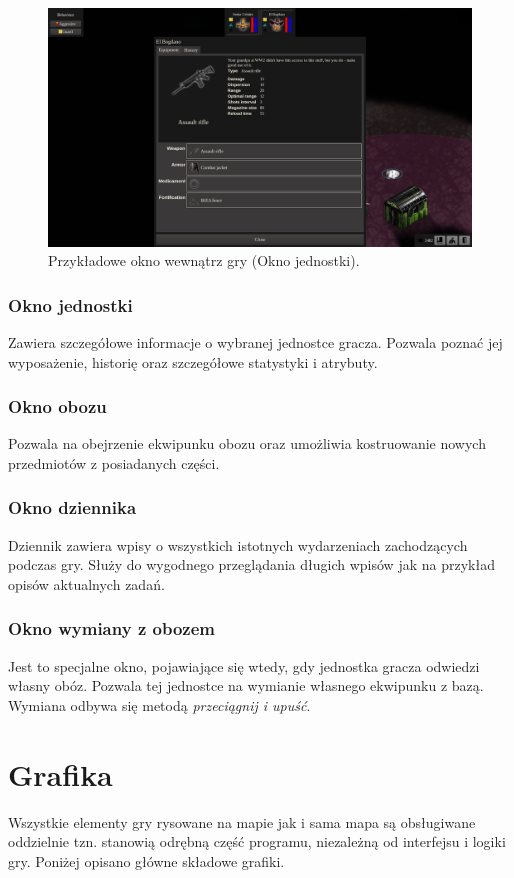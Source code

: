 \documentclass[licencjacka]{pracamgr}
\begin{document}
      \begin{figure}[htbp]
	\centering
	\includegraphics[scale=0.22]{Window.png}
	\caption{Przykładowe okno wewnątrz gry (Okno jednostki).}
      \end{figure}

      \subsubsection{Okno jednostki}
	Zawiera szczegółowe informacje o wybranej jednostce gracza. Pozwala poznać jej wyposażenie, historię oraz szczegółowe statystyki i atrybuty.
      \subsubsection{Okno obozu}
	Pozwala na obejrzenie ekwipunku obozu oraz umożliwia kostruowanie nowych przedmiotów z posiadanych części.
      \subsubsection{Okno dziennika}
	Dziennik zawiera wpisy o wszystkich istotnych wydarzeniach zachodzących podczas gry. Służy do wygodnego przeglądania długich wpisów jak na przykład
	opisów aktualnych zadań.
      \subsubsection{Okno wymiany z obozem}
	Jest to specjalne okno, pojawiające się wtedy, gdy jednostka gracza odwiedzi własny obóz. Pozwala tej jednostce na wymianie własnego ekwipunku z bazą.
	Wymiana odbywa się metodą \emph{przeciągnij i upuść}.


  \section{Grafika}
    Wszystkie elementy gry rysowane na mapie jak i sama mapa są obsługiwane oddzielnie tzn. stanowią odrębną część programu, niezależną od interfejsu i logiki gry.
    Poniżej opisano główne składowe grafiki.
\end{document}
